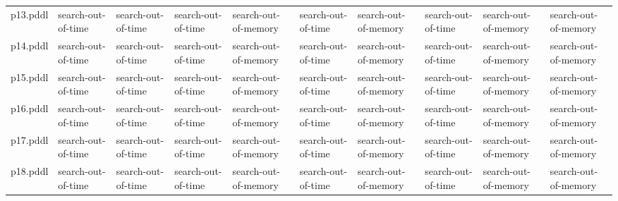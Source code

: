 \documentclass{article}
\begin{document}
\begin{tabular}{@{}lrrrrrrrrr@{}}
p13.pddl & \multicolumn{1}{|l|}{search-out-of-time} & \multicolumn{1}{|l|}{search-out-of-time} & \multicolumn{1}{|l|}{search-out-of-time} & \multicolumn{1}{|l|}{search-out-of-memory} & \multicolumn{1}{|l|}{search-out-of-time} & \multicolumn{1}{|l|}{search-out-of-memory} & \multicolumn{1}{|l|}{search-out-of-time} & \multicolumn{1}{|l|}{search-out-of-memory} & \multicolumn{1}{|l|}{search-out-of-memory} \\
p14.pddl & \multicolumn{1}{|l|}{search-out-of-time} & \multicolumn{1}{|l|}{search-out-of-time} & \multicolumn{1}{|l|}{search-out-of-time} & \multicolumn{1}{|l|}{search-out-of-memory} & \multicolumn{1}{|l|}{search-out-of-time} & \multicolumn{1}{|l|}{search-out-of-memory} & \multicolumn{1}{|l|}{search-out-of-time} & \multicolumn{1}{|l|}{search-out-of-memory} & \multicolumn{1}{|l|}{search-out-of-memory} \\
p15.pddl & \multicolumn{1}{|l|}{search-out-of-time} & \multicolumn{1}{|l|}{search-out-of-time} & \multicolumn{1}{|l|}{search-out-of-time} & \multicolumn{1}{|l|}{search-out-of-memory} & \multicolumn{1}{|l|}{search-out-of-time} & \multicolumn{1}{|l|}{search-out-of-memory} & \multicolumn{1}{|l|}{search-out-of-time} & \multicolumn{1}{|l|}{search-out-of-memory} & \multicolumn{1}{|l|}{search-out-of-memory} \\
p16.pddl & \multicolumn{1}{|l|}{search-out-of-time} & \multicolumn{1}{|l|}{search-out-of-time} & \multicolumn{1}{|l|}{search-out-of-time} & \multicolumn{1}{|l|}{search-out-of-memory} & \multicolumn{1}{|l|}{search-out-of-time} & \multicolumn{1}{|l|}{search-out-of-memory} & \multicolumn{1}{|l|}{search-out-of-time} & \multicolumn{1}{|l|}{search-out-of-memory} & \multicolumn{1}{|l|}{search-out-of-memory} \\
p17.pddl & \multicolumn{1}{|l|}{search-out-of-time} & \multicolumn{1}{|l|}{search-out-of-time} & \multicolumn{1}{|l|}{search-out-of-time} & \multicolumn{1}{|l|}{search-out-of-memory} & \multicolumn{1}{|l|}{search-out-of-time} & \multicolumn{1}{|l|}{search-out-of-memory} & \multicolumn{1}{|l|}{search-out-of-time} & \multicolumn{1}{|l|}{search-out-of-memory} & \multicolumn{1}{|l|}{search-out-of-memory} \\
p18.pddl & \multicolumn{1}{|l|}{search-out-of-time} & \multicolumn{1}{|l|}{search-out-of-time} & \multicolumn{1}{|l|}{search-out-of-time} & \multicolumn{1}{|l|}{search-out-of-memory} & \multicolumn{1}{|l|}{search-out-of-time} & \multicolumn{1}{|l|}{search-out-of-memory} & \multicolumn{1}{|l|}{search-out-of-time} & \multicolumn{1}{|l|}{search-out-of-memory} & \multicolumn{1}{|l|}{search-out-of-memory} \\

\end{tabular}
\end{document}
